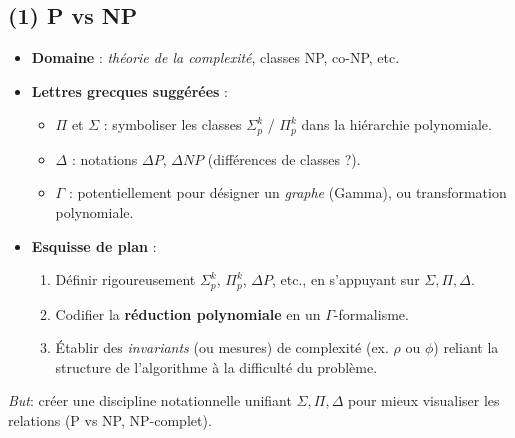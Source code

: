 \documentclass[12pt]{article}
\begin{document}
\subsection{(1) P vs NP}
\begin{itemize}
    \item \textbf{Domaine} : \emph{théorie de la complexité}, classes NP, co-NP, etc.
    \item \textbf{Lettres grecques suggérées} :
    \begin{itemize}
        \item \(\Pi\) et \(\Sigma\) : symboliser les classes \(\Sigma_p^k\) / \(\Pi_p^k\) 
              dans la hiérarchie polynomiale.
        \item \(\Delta\) : notations \(\Delta P\), \(\Delta NP\) (différences de classes ?).
        \item \(\Gamma\) : potentiellement pour désigner un \emph{graphe} (Gamma), 
              ou transformation polynomiale.
    \end{itemize}
    \item \textbf{Esquisse de plan} :
    \begin{enumerate}
        \item Définir rigoureusement \(\Sigma_p^k\), \(\Pi_p^k\), \(\Delta P\), etc., 
              en s’appuyant sur \(\Sigma,\Pi,\Delta\).
        \item Codifier la \textbf{réduction polynomiale} en un $\Gamma$-formalisme.
        \item Établir des \emph{invariants} (ou mesures) de complexité (ex. \(\rho\) ou \(\phi\)) 
              reliant la structure de l’algorithme à la difficulté du problème.
    \end{enumerate}
\end{itemize}
\emph{But}: créer une discipline notationnelle unifiant \(\Sigma,\Pi,\Delta\) 
pour mieux visualiser les relations (P vs NP, NP-complet).
\end{document}
